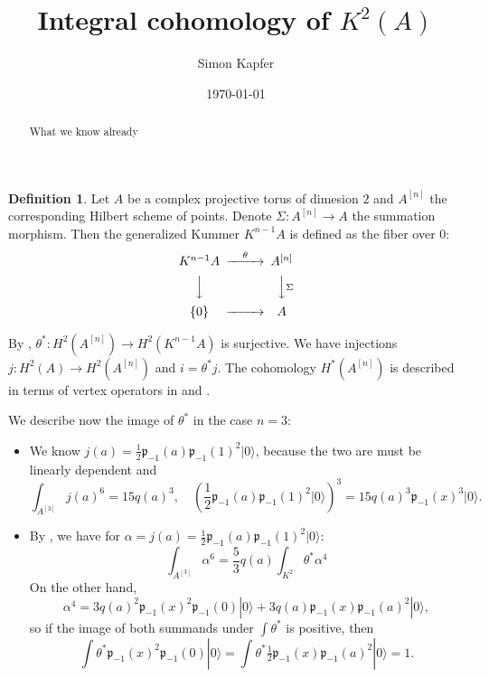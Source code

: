 \documentclass{amsart}
\newcommand{\hilb}[1]{^{[#1]}}
\newcommand{\vac}{|0\rangle}
\newcommand{\p}{\mathfrak{p}}
\theoremstyle{plain}
\theoremstyle{definition}
\newtheorem{definition}[theorem]{Definition}
\theoremstyle{remark}
\begin{document}
\title{Integral cohomology of $K^2(A)$}


\author{Simon Kapfer}
\address{Simon Kapfer, Laboratoire de Math\'ematiques et Applications, UMR CNRS 6086, Universit\'e de Poitiers, T\'el\'eport 2, Boulevard Marie et Pierre Curie, F-86962 Futuroscope Chasseneuil}


\date{\today}


\begin{abstract} 
What we know already
\end{abstract}

\maketitle

\begin{definition}
Let $A$ be a complex projective torus of dimesion $2$ and $A\hilb{n}$ the corresponding Hilbert scheme of points. Denote $\Sigma : A\hilb{n} \rightarrow A$ the summation morphism. Then the generalized Kummer $K^{n-1} A $ is defined as the fiber over $0$:
\begin{equation*}
\begin{CD}
K^{n-1}A @>\theta >> A\hilb{n}\\
@VVV @VV\Sigma V\\
\{0\} @> >> A
\end{CD}
\end{equation*}
\end{definition}
By \cite{Beauville}, $\theta^{\ast} : H^2(A\hilb{n}) \rightarrow H^2(K^{n-1}A)$ is surjective. We have injections $j : H^2(A)\rightarrow H^2(A\hilb{n})$ and $i = \theta^* j$. The cohomology $H^*(A\hilb{n})$ is described in terms of vertex operators in \cite{LehnSorger} and \cite{LiQinWang}.

We describe now the image of $\theta^*$ in the case $n=3$:
\begin{itemize}
\item We know $j(a)=\frac{1}{2}\p_{-1}(a)\p_{-1}(1)^2\vac$, because the two are must be linearly dependent and
$$ \int_{A\hilb{3}}j(a)^6 = 15 q(a)^3, \quad \left(\frac{1}{2}\p_{-1}(a)\p_{-1}(1)^2\vac\right)^3 = 15 q(a)^3\p_{-1}(x)^3\vac.
$$
\item By \cite[p. 8]{Britze}, we have for $\alpha = j(a)=\frac{1}{2}\p_{-1}(a)\p_{-1}(1)^2\vac$: 
$$ \int_{A\hilb{3}}\alpha^6 = \frac{5}{3} q(a) \int_{K^2} \theta^* \alpha^4
$$
On the other hand, 
$$\alpha^4 = 3 q(a)^2\p_{-1}(x)^2\p_{-1}(0)\vac + 3q(a) \p_{-1}(x) \p_{-1}(a)^2\vac,$$
so if the image of both summands under $\int\theta^*$ is positive, then 
$$ \int\theta^*\p_{-1}(x)^2\p_{-1}(0)\vac = \int\theta^* \tfrac{1}{2}\p_{-1}(x) \p_{-1}(a)^2\vac=1 .$$ 

\end{itemize}




\end{document}
